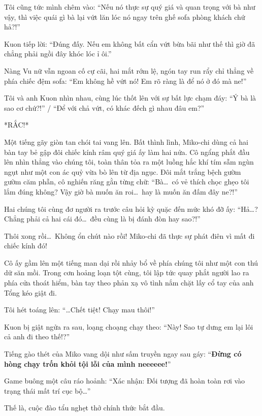 \documentclass[../main.tex]{subfiles}
\begin{document}
Tôi cũng tức mình chêm vào: ``Nếu nó thực sự quý giá và quan trọng với bà như vậy, thì việc quái gì bà lại vứt lăn lóc nó ngay trên ghế sofa phòng khách chứ hả?!''

Kuon tiếp lời: ``Đúng đấy. Nếu em không bất cẩn vứt bừa bãi như thế thì giờ đã chẳng phải ngồi đây khóc lóc ỉ ôi.''

Nàng Vu nữ vẫn ngoan cố cự cãi, hai mắt rớm lệ, ngón tay run rẩy chỉ thẳng về phía chiếc đệm sofa: ``Em không hề vứt nó! Em rõ ràng là để nó ở đó mà ne!''

Tôi và anh Kuon nhìn nhau, cùng lúc thốt lên với sự bất lực chạm đáy:  ``Ý bà là sao cơ chứ?!'' / ``Để với chả vứt, có khác đếch gì nhau đâu em?''

*RẮC!*

Một tiếng gãy giòn tan chói tai vang lên. Bất thình lình, Miko-chi dùng cả hai bàn tay bẻ gập đôi chiếc kính râm quý giá ấy làm hai nửa. Cô ngẩng phắt đầu lên nhìn thẳng vào chúng tôi, toàn thân tỏa ra một luồng hắc khí tím sẫm ngùn ngụt như một con ác quỷ vừa bò lên từ địa ngục. Đôi mắt trắng bệch gườm gườm căm phẫn, cô nghiến răng gằn từng chữ: ``Bà\dots\ có vẻ thích chọc ghẹo tôi lắm đúng không? Vậy giờ bà muốn ăn roi\dots\ hay là muốn ăn đấm đây ne?!''


Hai chúng tôi cùng đơ người ra trước câu hỏi kỳ quặc đến mức khó đỡ ấy: ``Hả\dots? Chẳng phải cả hai cái đó\dots\ đều cùng là bị đánh đòn hay sao?!''

Thôi xong rồi\dots\ Không ổn chút nào rồi! Miko-chi đã thực sự phát điên vì mất đi chiếc kính đó!

Cô ấy gầm lên một tiếng man dại rồi nhảy bổ về phía chúng tôi như một con thú dữ săn mồi. Trong cơn hoảng loạn tột cùng, tôi lập tức quay phắt người lao ra phía cửa thoát hiểm, bàn tay theo phản xạ vô tình nắm chặt lấy cổ tay của anh Tổng kéo giật đi.

Tôi hét toáng lên: ``\dots Chết tiệt! Chạy mau thôi!''

Kuon bị giật ngửa ra sau, loạng choạng chạy theo: ``Này! Sao tự dưng em lại lôi cả anh đi theo thế!?''

Tiếng gào thét của Miko vang dội như sấm truyền ngay sau gáy: ``\textbf{Đừng có hòng chạy trốn khỏi tội lỗi của mình neeeeee!}''

Game buông một câu ráo hoảnh: ``Xác nhận: Đối tượng đã hoàn toàn rơi vào trạng thái mất trí cục bộ\dots''

Thế là, cuộc đào tẩu nghẹt thở chính thức bắt đầu.
\end{document}
